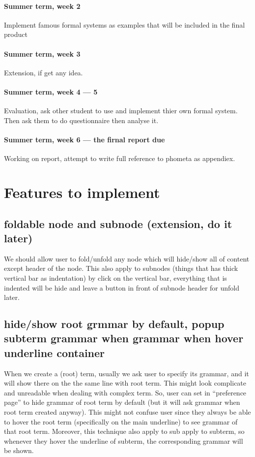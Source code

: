 \paragraph{Summer term, week 2} Implement famous formal systems as examples that will be included in the final product

\paragraph{Summer term, week 3} Extension, if get any idea.

\paragraph{Summer term, week 4 --- 5} Evaluation, ask other student to use and implement thier own formal system. Then ask them to do questionnaire then analyse it.

\paragraph{Summer term, week 6 --- the firnal report due} Working on report, attempt to write full reference to phometa as appendiex.


\section{Features to implement}

\subsection{foldable node and subnode (extension, do it later)}

We should allow user to fold/unfold any node which will hide/show all of content except header of the node. This also apply to subnodes (things that has thick vertical bar as indentation) by click on the vertical bar, everything that is indented will be hide and leave a button in front of subnode header for unfold later.

\subsection{hide/show root grmmar by default, popup subterm grammar when  grammar when hover underline container}

When we create a (root) term, usually we ask user to specify its grammar, and it will show there on the the same line with root term. This might look complicate and unreadable when dealing with complex term. So, user can set in ``preference page'' to hide grammar of root term by default (but it will ask grammar when root term created anyway). This might not confuse user since they always be able to hover the root term (specifically on the main underline) to see grammar of that root term. Moreover, this technique also apply to sub  apply to subterm, so whenever they hover the underline of subterm, the corresponding grammar will be shown.

